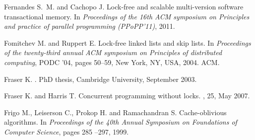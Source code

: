 \begin{thebibliography}{99}
{%





Fernandes S.~M. and Cachopo J.
\newblock Lock-free and scalable multi-version software transactional memory.
\newblock In {\em Proceedings of the 16th ACM symposium on Principles and practice of parallel programming (PPoPP'11)}, 2011.





Fomitchev M. and Ruppert E.
\newblock Lock-free linked lists and skip lists.
\newblock In {\em Proceedings of the twenty-third annual ACM symposium on
  Principles of distributed computing}, PODC '04, pages 50--59, New York, NY,
  USA, 2004. ACM.


Fraser K.
.
\newblock PhD thesis, Cambridge University, September 2003.




Fraser K. and Harris T.
\newblock Concurrent programming without locks.
, 25, May 2007.


Frigo M., Leiserson C., Prokop H. and Ramachandran S.
\newblock Cache-oblivious algorithms.
\newblock In {\em Proceedings of the 40th Annual Symposium on Foundations of
  Computer Science}, pages 285 --297, 1999.






}
\end{thebibliography}
